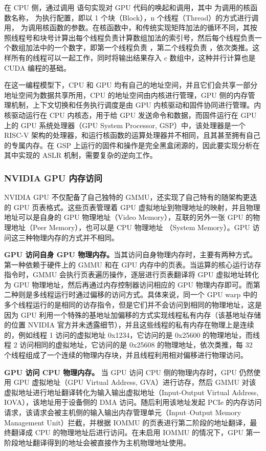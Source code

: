 在 CPU 侧，通过调用  语句实现对 GPU 代码的唤起和调用，其中  为调用的核函数名称， 为执行配置，即以 1 个块（Block），n 个线程（Thread）的方式进行调用， 为调用核函数的参数。在核函数中，和传统实现矩阵加法的循环不同，其按照线程号和块号计算出每个线程负责计算数组加法的索引号，然后每个线程负责一个数组加法中的一个数字，即第一个线程负责 ，第二个线程负责 ，依次类推。这样所有的线程可以一起工作，同时将输出结果存入 c 数组中，这种并行计算也是 CUDA 编程的基础。

在这一编程模型下，CPU 和 GPU 均有自己的地址空间，并且它们会共享一部分地址空间为数据共享所用，CPU 的地址空间由内核进行管理，GPU 侧的内存管理机制，上下文切换和任务执行调度是由 GPU 内核驱动和固件协同进行管理。内核驱动运行在 CPU 内核态，用于给 GPU 发送命令和数据，而固件运行在 GPU 上的 GPU 系统处理器（GPU System Processor, GSP）中，该处理器是一个 RISC-V 架构的处理器，和运行核函数的运算处理器并不相同，且其甚至拥有自己的专属内存。在 GSP 上运行的固件和操作是完全黑盒闭源的，因此要实现分析在其中实现的 ASLR 机制，需要复杂的逆向工作。

\subsubsection{NVIDIA GPU 内存访问}
NVIDIA GPU 不仅配备了自己独特的 GMMU，还实现了自己特有的随架构更迭的 GPU 页表格式。这些页表管理着 GPU 虚拟地址到物理地址的映射，并且物理地址可以是自身的 GPU 物理地址（Video Memory），互联的另外一张 GPU 的物理地址（Peer Memory），也可以是 CPU 物理地址 （System Memory）。GPU 访问这三种物理内存的方式并不相同。

\textbf{GPU 访问自身 GPU 物理内存。}当其访问自身物理内存时，主要有两种方式。第一种依赖于硬件上的 GMMU 和在 GPU 内存中的页表。当运算的核心运行访存指令时，GMMU 会执行页表遍历操作，逐层进行页表翻译将 GPU 虚拟地址转化为 GPU 物理地址，然后再通过内存控制器访问相应的 GPU 物理内存即可。而第二种则是多线程运行时通过偏移的访问方式。具体来说，同一个 GPU warp 中的多个线程运行的是相同的访存指令，但是它们并不会访问到相同的物理地址，这是因为 GPU 利用一个特殊的基地址加偏移的方式实现线程私有内存（该基地址存储的位置 NVIDIA 官方并未透露细节），并且这些线程的私有内存在物理上是连续的，例如线程 1 访问的虚拟地址 0x1234，它访问的是 0x25600 的物理地址，而线程 2 访问相同的虚拟地址，它访问的是 0x25608 的物理地址，依次类推，每 32 个线程组成了一个连续的物理内存块，并且线程利用相对偏移进行物理访问。

\textbf{GPU 访问 CPU 物理内存。}
当 GPU 访问 CPU 侧的物理内存时，GPU 仍然使用 GPU 虚拟地址（GPU Virtual Address, GVA）进行访存，然后 GMMU 对该虚拟地址进行地址翻译转化为输入输出虚拟地址（Input-Output Virtual Address, IOVA），该地址用于设备侧的 DMA 访问。随后利用该地址发起 PCIe 的内存访问请求，该请求会被主机侧的输入输出内存管理单元（Input–Output Memory Management Unit）拦截，并根据 IOMMU 的页表进行第二阶段的地址翻译，最终翻译成 CPU 的物理地址后进行访问。在未启用 IOMMU 的情况下，GPU 第一阶段地址翻译得到的地址会被直接作为主机物理地址使用。

